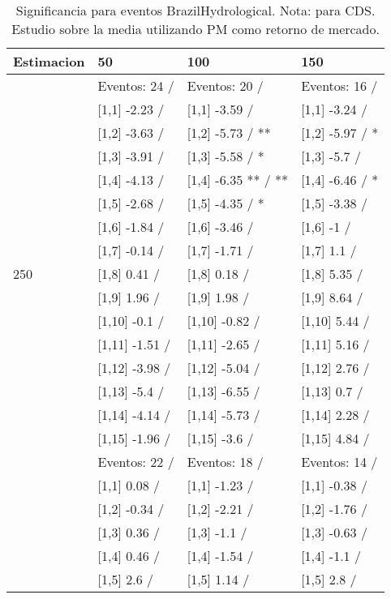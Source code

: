 \begin{table}

\caption{Significancia para eventos BrazilHydrological. Nota: para CDS. Estudio sobre la media utilizando PM como retorno de mercado.}
\centering
\begin{tabular}[t]{llll}
\toprule
Estimacion & 50 & 100 & 150\\
\midrule
 & Eventos:  24 / & Eventos:  20 / & Eventos:  16 /\\
 & {}[1,1] -2.23  / & {}[1,1] -3.59  / & {}[1,1] -3.24  /\\
 & {}[1,2] -3.63  / & {}[1,2] -5.73  / ** & {}[1,2] -5.97  / *\\
 & {}[1,3] -3.91  / & {}[1,3] -5.58  / * & {}[1,3] -5.7  /\\
 & {}[1,4] -4.13  / & {}[1,4] -6.35 ** / ** & {}[1,4] -6.46  / *\\
\addlinespace
 & {}[1,5] -2.68  / & {}[1,5] -4.35  / * & {}[1,5] -3.38  /\\
 & {}[1,6] -1.84  / & {}[1,6] -3.46  / & {}[1,6] -1  /\\
 & {}[1,7] -0.14  / & {}[1,7] -1.71  / & {}[1,7] 1.1  /\\
250 & {}[1,8] 0.41  / & {}[1,8] 0.18  / & {}[1,8] 5.35  /\\
 & {}[1,9] 1.96  / & {}[1,9] 1.98  / & {}[1,9] 8.64  /\\
\addlinespace
 & {}[1,10] -0.1  / & {}[1,10] -0.82  / & {}[1,10] 5.44  /\\
 & {}[1,11] -1.51  / & {}[1,11] -2.65  / & {}[1,11] 5.16  /\\
 & {}[1,12] -3.98  / & {}[1,12] -5.04  / & {}[1,12] 2.76  /\\
 & {}[1,13] -5.4  / & {}[1,13] -6.55  / & {}[1,13] 0.7  /\\
 & {}[1,14] -4.14  / & {}[1,14] -5.73  / & {}[1,14] 2.28  /\\
\addlinespace
 & {}[1,15] -1.96  / & {}[1,15] -3.6  / & {}[1,15] 4.84  /\\
 & Eventos:  22 / & Eventos:  18 / & Eventos:  14 /\\
 & {}[1,1] 0.08  / & {}[1,1] -1.23  / & {}[1,1] -0.38  /\\
 & {}[1,2] -0.34  / & {}[1,2] -2.21  / & {}[1,2] -1.76  /\\
 & {}[1,3] 0.36  / & {}[1,3] -1.1  / & {}[1,3] -0.63  /\\
\addlinespace
 & {}[1,4] 0.46  / & {}[1,4] -1.54  / & {}[1,4] -1.1  /\\
 & {}[1,5] 2.6  / & {}[1,5] 1.14  / & {}[1,5] 2.8  /\\

\end{tabular}
\end{table}
